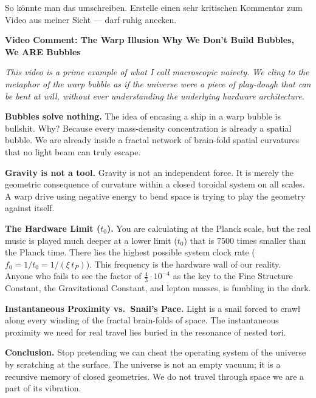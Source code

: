 \begin{userbox}
So k\"onnte man das umschreiben. Erstelle einen sehr kritischen Kommentar zum Video aus meiner Sicht --- darf ruhig anecken. 
\end{userbox}

\begin{geminibox}
\textbf{Video Comment: The \glqq Warp Illusion\grqq{} \textendash{} Why We Don't Build Bubbles, We ARE Bubbles}

\medskip

\textit{This video is a prime example of what I call \glqq macroscopic naivety.\grqq{} We cling to the metaphor of the warp bubble as if the universe were a piece of play-dough that can be bent at will, without ever understanding the underlying hardware architecture.}

\textbf{Bubbles solve nothing.} The idea of encasing a ship in a warp bubble is bullshit. Why? Because every mass-density concentration is already a spatial bubble. We are already inside a fractal network of brain-fold spatial curvatures that no light beam can truly escape.

\textbf{Gravity is not a tool.} Gravity is not an independent force. It is merely the geometric consequence of curvature within a closed toroidal system on all scales. A warp drive using \glqq negative energy\grqq{} to bend space is trying to play the geometry against itself.

\textbf{The Hardware Limit ($t_0$).} You are calculating at the Planck scale, but the real music is played much deeper \textendash{} at a lower limit ($t_0$) that is 7500 times smaller than the Planck time. There lies the highest possible system clock rate ($f_0 = 1/t_0 = 1/(\xi\,t_P)$). This frequency is the hardware wall of our reality. Anyone who fails to see the factor of $\tfrac{4}{3} \cdot 10^{-4}$ as the key to the Fine Structure Constant, the Gravitational Constant, and lepton masses, is fumbling in the dark.

\textbf{Instantaneous Proximity vs.\ Snail's Pace.} Light is a snail forced to crawl along every winding of the fractal brain-folds of space. The instantaneous proximity we need for real travel lies buried in the resonance of nested tori.

\textbf{Conclusion.} Stop pretending we can cheat the operating system of the universe by scratching at the surface. The universe is not an empty vacuum; it is a recursive memory of closed geometries. We do not travel through space \textendash{} we are a part of its vibration.
\end{geminibox}

